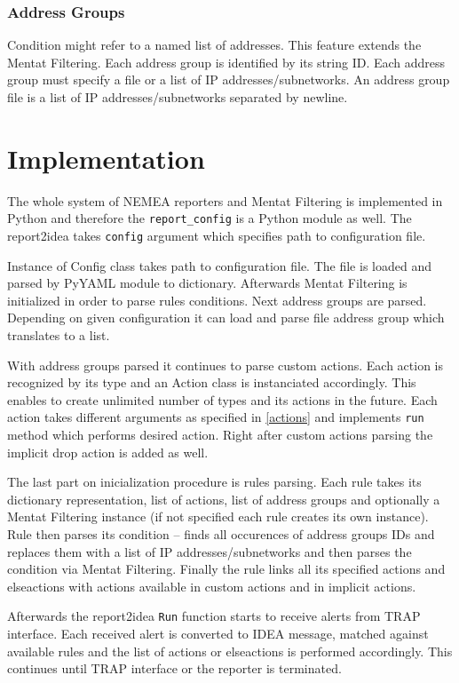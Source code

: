 \documentclass[11pt,a4paper]{article}
\begin{document}
\subsubsection{Address Groups}

Condition might refer to a named list of addresses. This feature extends the Mentat Filtering. Each address group is identified by its string ID. Each address group must specify a file or a list of IP addresses/subnetworks. An address group file is a list of IP addresses/subnetworks separated by newline.

\section{Implementation}

The whole system of NEMEA reporters and Mentat Filtering is implemented in Python and therefore the \texttt{report\_config} is a Python module as well. The report2idea takes \texttt{config} argument which specifies path to configuration file.

Instance of Config class takes path to configuration file. The file is loaded and parsed by PyYAML module to dictionary. Afterwards Mentat Filtering is initialized in order to parse rules conditions. Next address groups are parsed. Depending on given configuration it can load and parse file address group which translates to a list.

With address groups parsed it continues to parse custom actions. Each action is recognized by its type and an Action class is instanciated accordingly. This enables to create unlimited number of types and its actions in the future. Each action takes different arguments as specified in \ref{actions} and implements \texttt{run} method which performs desired action. Right after custom actions parsing the implicit drop action is added as well.

The last part on inicialization procedure is rules parsing. Each rule takes its dictionary representation, list of actions, list of address groups and optionally a Mentat Filtering instance (if not specified each rule creates its own instance). Rule then parses its condition -- finds all occurences of address groups IDs and replaces them with a list of IP addresses/subnetworks and then parses the condition via Mentat Filtering. Finally the rule links all its specified actions and elseactions with actions available in custom actions and in implicit actions.

Afterwards the report2idea \texttt{Run} function starts to receive alerts from TRAP interface. Each received alert is converted to IDEA message, matched against available rules and the list of actions or elseactions is performed accordingly. This continues until TRAP interface or the reporter is terminated.
\end{document}
